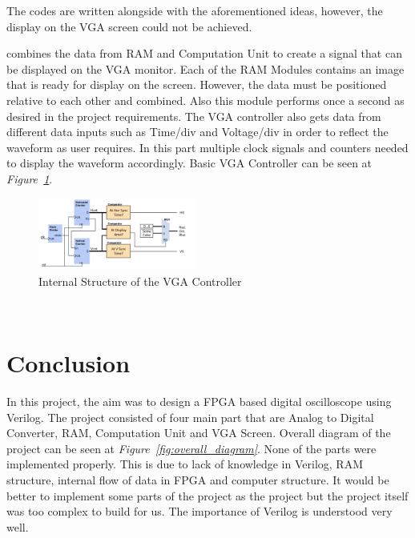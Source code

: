 \documentclass[paper]{IEEEtran}
\begin{document}
The codes are written alongside with the aforementioned ideas, however, the display on the VGA screen could not be achieved. 

combines the data from RAM and Computation Unit to create a signal that can be displayed on the VGA monitor. Each of the RAM Modules contains an image that is ready for display on the screen. However, the data must be positioned relative to each other and combined. Also this module performs once a second as desired in the project requirements. The VGA controller also gets data from different data inputs such as Time/div and Voltage/div in order to reflect the waveform as user requires. In this part multiple clock signals and counters needed to display the waveform accordingly. Basic VGA Controller can be seen at \textit{Figure~\ref{fig:vgacontroller}}.

\begin{figure}[h!]
	\setlength{\unitlength}{\textwidth}
	\center 
	\includegraphics[width=0.47\textwidth]{vgacontroller}
	\caption{\label{fig:vgacontroller} Internal Structure of the VGA Controller}
\end{figure}
	
\- \\[3cm]	
	
	
\section{Conclusion}
\- \indent
	In this project, the aim was to design a FPGA based digital oscilloscope using Verilog. The project consisted of four main part that are Analog to Digital Converter, RAM, Computation Unit and VGA Screen. Overall diagram of the project can be seen at \textit{Figure~\ref{fig:overall_diagram}}. None of the parts were implemented properly. This is due to lack of knowledge in Verilog, RAM structure, internal flow of data in FPGA and computer structure. It would be better to implement some parts of the project as the project but the project itself was too complex to build for us. The importance of Verilog is understood very well.
	
	
\end{document}
